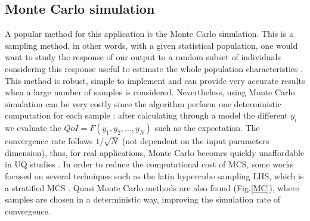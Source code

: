 \documentclass[11pt, a4paper, English]{report}
\begin{document}
\subsection{Monte Carlo simulation}
A popular method for this application is the Monte Carlo simulation. This is a sampling method, in other words, with a given statistical population, one would want to study the response of our output to a random subset of individuals considering this response useful to estimate the whole population characteristics \cite{proba}. This method is robust, simple to implement and can provide very accurate results when a large number of samples is considered. Nevertheless, using Monte Carlo simulation can be very costly since the algorithm perform one deterministic computation for each sample : after calculating through a model the different $y_i$ we evaluate the $QoI = F(y_1,y_2,...,y_N)$ such as the expectation. The convergence rate follows $1/\sqrt{N}$ (not dependent on the input parameters dimension), thus, for real applications, Monte Carlo becomes quickly unaffordable in UQ studies \cite{Janthesis}. In order to reduce the computational cost of MCS, some works focused on several techniques such as the latin hypercube sampling LHS, which is a stratified MCS \cite{lhs}. Quasi Monte Carlo methods are also found (Fig.\ref{MC}), where samples are chosen in a deterministic way, improving the simulation rate of convergence. 
\end{document}
